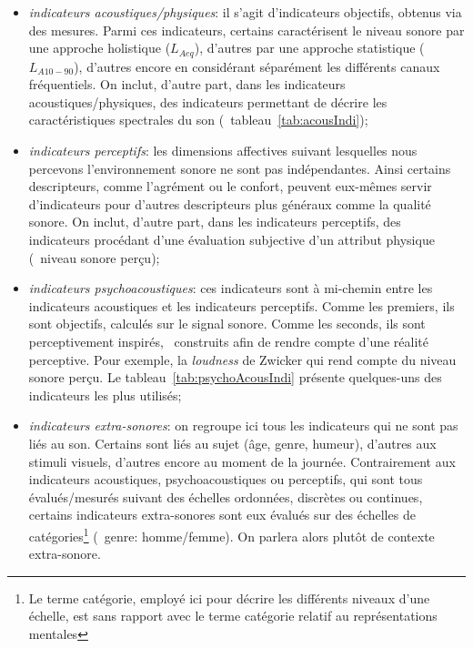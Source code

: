 \begin{itemize}
\begin{itemize}
\item \emph{indicateurs acoustiques/physiques}: il s'agit d'indicateurs objectifs, obtenus via des mesures. Parmi ces indicateurs, certains caractérisent le niveau sonore par une approche holistique ($L_{Aeq}$), d'autres par une approche statistique ($L_{A10-90}$), d'autres encore en considérant séparément les différents canaux fréquentiels. On inclut, d'autre part, dans les indicateurs acoustiques/physiques, des indicateurs permettant de décrire les caractéristiques spectrales du son (\cf~tableau~\ref{tab:acousIndi});

\item \emph{indicateurs perceptifs}: les dimensions affectives suivant lesquelles nous percevons l'environnement sonore ne sont pas indépendantes. Ainsi certains descripteurs, comme l'agrément ou le confort, peuvent eux-mêmes servir d'indicateurs pour d'autres descripteurs plus généraux comme la qualité sonore. On inclut, d'autre part, dans les indicateurs perceptifs, des indicateurs procédant d'une évaluation subjective d'un attribut physique (\eg~niveau sonore perçu);

\item \emph{indicateurs psychoacoustiques}: ces indicateurs sont à mi-chemin entre les indicateurs acoustiques et les indicateurs perceptifs. Comme les premiers, ils sont objectifs, calculés sur le signal sonore. Comme les seconds, ils sont perceptivement inspirés, \ie~construits afin de rendre compte d'une réalité perceptive. Pour exemple, la \emph{loudness} de Zwicker \citep{zwicker2013psychoacoustics} qui rend compte du niveau sonore perçu. Le tableau~\ref{tab:psychoAcousIndi} présente quelques-uns des indicateurs les plus utilisés;

\item \emph{indicateurs extra-sonores}: on regroupe ici tous les indicateurs qui ne sont pas liés au son. Certains sont liés au sujet (âge, genre, humeur), d'autres aux stimuli visuels, d'autres encore au moment de la journée. Contrairement aux indicateurs acoustiques, psychoacoustiques ou perceptifs, qui sont tous évalués/mesurés suivant des échelles ordonnées, discrètes ou continues, certains indicateurs extra-sonores sont eux évalués sur des échelles de catégories\footnote{Le terme catégorie, employé ici pour décrire les différents niveaux d'une échelle, est sans rapport avec le terme catégorie relatif au représentations mentales} (\eg~genre: homme/femme). On parlera alors plutôt de contexte extra-sonore.
\end{itemize}

\end{itemize}

